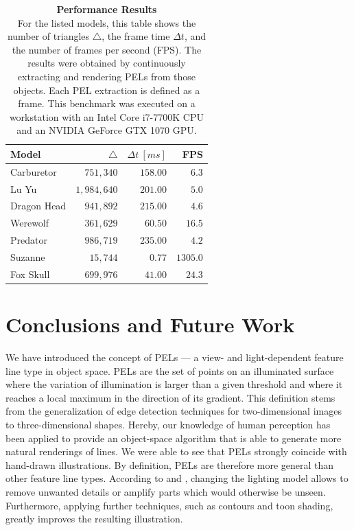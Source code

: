 \documentclass[9pt,fleqn,twoside,twocolumn]{stdglobal}
\begin{document}
    \begin{table}[h]
      \caption{%
        \textbf{Performance Results}\\
        For the listed models, this table shows the number of triangles $\triangle$, the frame time $\Delta t$, and the number of frames per second (FPS).
        The results were obtained by continuously extracting and rendering PELs from those objects.
        Each PEL extraction is defined as a frame.
        This benchmark was executed on a workstation with an
        \textrm{Intel Core i7-7700K} CPU and an
        \textrm{NVIDIA GeForce GTX 1070} GPU.
      }
      \label{tab:performance-results}
      \centering
      \footnotesize
      \renewcommand{\arraystretch}{1.2}
      \begin{tabular}{lrrr}
        \hline
        \textbf{Model} & $\triangle$ & $\Delta t\ [ms]$ & \textbf{FPS} \\
        \hline
        \hline
        \rowcolor{mathdefback}
        Carburetor & $751,340$ & $158.00$ & $6.3$ \\
        Lu Yu & $1,984,640$ & $201.00$ & $5.0$ \\
        \rowcolor{mathdefback}
        Dragon Head & $941,892$ & $215.00$ & $4.6$ \\
        Werewolf & $361,629$ & $60.50$ & $16.5$ \\
        \rowcolor{mathdefback}
        Predator & $986,719$ & $235.00$ & $4.2$ \\
        Suzanne & $15,744$ & $0.77$ & $1305.0$ \\
        \rowcolor{mathdefback}
        Fox Skull & $699,976$ & $41.00$ & $24.3$ \\
        \hline
      \end{tabular}
    \end{table}

\section{Conclusions and Future Work}
  We have introduced the concept of PELs --- a view- and light-dependent feature line type in object space.
  PELs are the set of points on an illuminated surface where the variation of illumination is larger than a given threshold and where it reaches a local maximum in the direction of its gradient.
  This definition stems from the generalization of edge detection techniques for two-dimensional images to three-dimensional shapes.
  Hereby, our knowledge of human perception has been applied to provide an object-space algorithm that is able to generate more natural renderings of lines.
  We were able to see that PELs strongly coincide with hand-drawn illustrations.
  By definition, PELs are therefore more general than other feature line types.
  According to \textcite{xie2007} and \textcite{zhang2010}, changing the lighting model allows to remove unwanted details or amplify parts which would otherwise be unseen.
  Furthermore, applying further techniques, such as contours and toon shading, greatly improves the resulting illustration.
\end{document}
